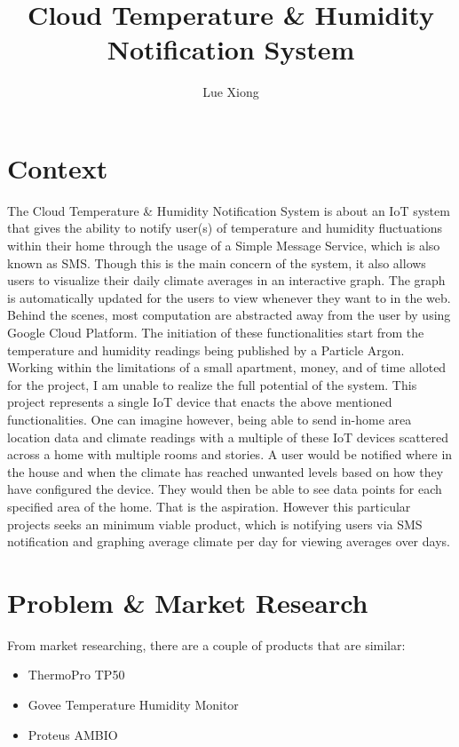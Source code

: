 \documentclass{article}
\title{Cloud Temperature \& Humidity Notification System}
\author{Lue Xiong}
\begin{document}
\maketitle
\newpage

\tableofcontents
\newpage

\obeylines

\section{Context}
The Cloud Temperature \& Humidity Notification System is about an IoT system that gives the ability to notify user(s) of temperature and humidity fluctuations within their home through the usage of a Simple Message Service, which is also known as SMS. Though this is the main concern of the system, it also allows users to visualize their daily climate averages in an interactive graph. The graph is automatically updated for the users to view whenever they want to in the web. Behind the scenes, most computation are abstracted away from the user by using Google Cloud Platform. The initiation of these functionalities start from the temperature and humidity readings being published by a Particle Argon.\\

Working within the limitations of a small apartment, money, and of time alloted for the project, I am unable to realize the full potential of the system. This project represents a single IoT device that enacts the above mentioned functionalities. One can imagine however, being able to send in-home area location data and climate readings with a multiple of these IoT devices scattered across a home with multiple rooms and stories. A user would be notified where in the house and when the climate has reached unwanted levels based on how they have configured the device. They would then be able to see data points for each specified area of the home. That is the aspiration. However this particular projects seeks an minimum viable product, which is notifying users via SMS notification and graphing average climate per day for viewing averages over days.

\section{Problem \& Market Research}
From market researching, there are a couple of products that are similar:
\begin{itemize}
    \item ThermoPro TP50
    \item Govee Temperature Humidity Monitor
    \item Proteus AMBIO
\end{itemize}
\end{document}

